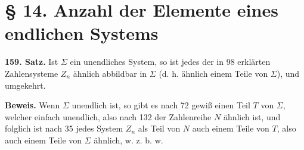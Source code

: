 \documentclass[11pt]{article}
\begin{document}
\section*{\S{} 14. Anzahl der Elemente eines endlichen Systems}

\noindent\textbf{159. Satz.} Ist $\Sigma$ ein unendliches System, so ist jedes der in 98 erklärten Zahlensysteme $Z_n$ ähnlich abbildbar in $\Sigma$ (d. h. ähnlich einem Teile von $\Sigma$), und umgekehrt.

\noindent\textbf{Beweis.} Wenn $\Sigma$ unendlich ist, so gibt es nach 72 gewiß einen Teil $T$ von $\Sigma$, welcher einfach unendlich, also nach 132 der Zahlenreihe $N$ ähnlich ist, und folglich ist nach 35 jedes System $Z_n$ als Teil von $N$ auch einem Teile von $T$, also auch einem Teile von $\Sigma$ ähnlich, w. z. b. w.
\end{document}

